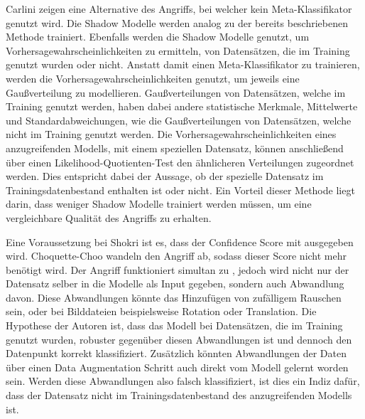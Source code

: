 Carlini \etal \cite{P-13} zeigen eine Alternative des Angriffs, bei welcher kein Meta-Klassifikator genutzt wird.
Die Shadow Modelle werden analog zu der bereits beschriebenen Methode trainiert. 
Ebenfalls werden die Shadow Modelle genutzt, um Vorhersagewahrscheinlichkeiten zu ermitteln, von Datensätzen, die im Training genutzt wurden oder nicht.
Anstatt damit einen Meta-Klassifikator zu trainieren, werden die Vorhersagewahrscheinlichkeiten genutzt, um jeweils eine Gaußverteilung zu modellieren.
Gaußverteilungen von Datensätzen, welche im Training genutzt werden, haben dabei andere statistische Merkmale, \zB Mittelwerte und Standardabweichungen, wie die Gaußverteilungen von Datensätzen, welche nicht im Training genutzt werden.
Die Vorhersagewahrscheinlichkeiten eines anzugreifenden Modells, mit einem speziellen Datensatz, können anschließend über einen Likelihood-Quotienten-Test den ähnlicheren Verteilungen zugeordnet werden.
Dies entspricht dabei der Aussage, ob der spezielle Datensatz im Trainingsdatenbestand enthalten ist oder nicht.
Ein Vorteil dieser Methode liegt darin, dass weniger Shadow Modelle trainiert werden müssen, um eine vergleichbare Qualität des Angriffs zu erhalten.


Eine Voraussetzung bei Shokri \etal \cite{P-2} ist es, dass der Confidence Score mit ausgegeben wird.
Choquette-Choo \etal \cite{P-7} wandeln den Angriff ab, sodass dieser Score nicht mehr benötigt wird.
Der Angriff funktioniert simultan zu \cite{P-2}, jedoch wird nicht nur der Datensatz selber in die Modelle als Input gegeben, sondern auch Abwandlung davon. 
Diese Abwandlungen könnte das Hinzufügen von zufälligem Rauschen sein, oder bei Bilddateien beispielsweise Rotation oder Translation.
Die Hypothese der Autoren ist, dass das Modell bei Datensätzen, die im Training genutzt wurden, robuster gegenüber diesen Abwandlungen ist und dennoch den Datenpunkt korrekt klassifiziert.
Zusätzlich könnten Abwandlungen der Daten über einen Data Augmentation Schritt auch direkt vom Modell gelernt worden sein.
Werden diese Abwandlungen also falsch klassifiziert, ist dies ein Indiz dafür, dass der Datensatz nicht im Trainingsdatenbestand des anzugreifenden Modells ist.

